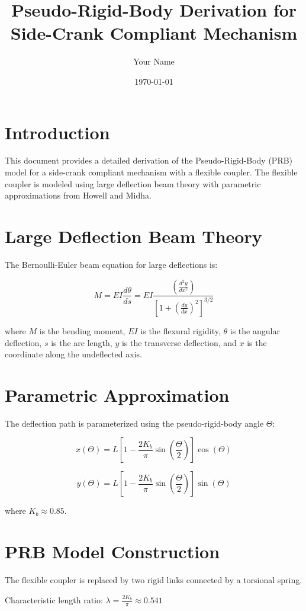 \documentclass{article}
\title{Pseudo-Rigid-Body Derivation for Side-Crank Compliant Mechanism}
\author{Your Name}
\date{\today}
\begin{document}
\maketitle

\section{Introduction}

This document provides a detailed derivation of the Pseudo-Rigid-Body (PRB) model for a side-crank compliant mechanism with a flexible coupler. The flexible coupler is modeled using large deflection beam theory with parametric approximations from Howell and Midha.

\section{Large Deflection Beam Theory}

The Bernoulli-Euler beam equation for large deflections is:

\[ M = EI \frac{d\theta}{ds} = EI \frac{\left(\frac{d^2y}{dx^2}\right)}{\left[1 + \left(\frac{dy}{dx}\right)^2\right]^{3/2}} \]

where $M$ is the bending moment, $EI$ is the flexural rigidity, $\theta$ is the angular deflection, $s$ is the arc length, $y$ is the transverse deflection, and $x$ is the coordinate along the undeflected axis.

\section{Parametric Approximation}

The deflection path is parameterized using the pseudo-rigid-body angle $\Theta$:

\[ x(\Theta) = L \left[1 - \frac{2K_b}{\pi}\sin\left(\frac{\Theta}{2}\right)\right]\cos(\Theta) \]

\[ y(\Theta) = L \left[1 - \frac{2K_b}{\pi}\sin\left(\frac{\Theta}{2}\right)\right]\sin(\Theta) \]

where $K_b \approx 0.85$.

\section{PRB Model Construction}

The flexible coupler is replaced by two rigid links connected by a torsional spring.

Characteristic length ratio: $\lambda = \frac{2K_b}{\pi} \approx 0.541$
\end{document}
